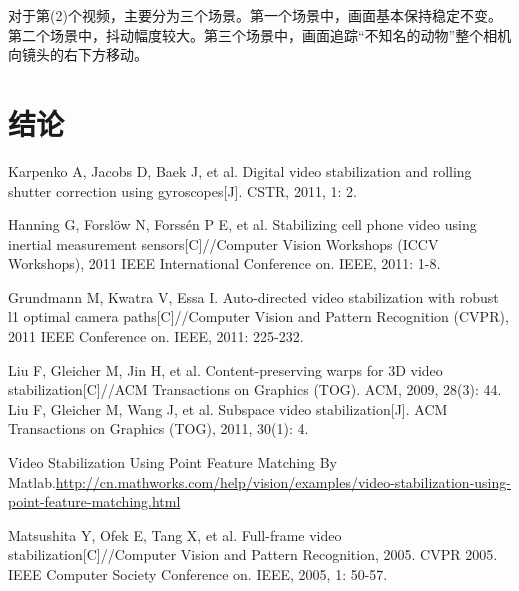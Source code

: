 \documentclass[journal, a4paper]{IEEEtran}
\begin{document}
    对于第(2)个视频，主要分为三个场景。第一个场景中，画面基本保持稳定不变。第二个场景中，抖动幅度较大。第三个场景中，画面追踪“不知名的动物”整个相机向镜头的右下方移动。
    
\section{结论}


\begin{thebibliography}{5}

Karpenko A, Jacobs D, Baek J, et al. Digital video stabilization and rolling shutter correction using gyroscopes[J]. CSTR, 2011, 1: 2.

    Hanning G, Forslöw N, Forssén P E, et al. Stabilizing cell phone video using inertial measurement sensors[C]//Computer Vision Workshops (ICCV Workshops), 2011 IEEE International Conference on. IEEE, 2011: 1-8.
    
    Grundmann M, Kwatra V, Essa I. Auto-directed video stabilization with robust l1 optimal camera paths[C]//Computer Vision and Pattern Recognition (CVPR), 2011 IEEE Conference on. IEEE, 2011: 225-232.
    
    Liu F, Gleicher M, Jin H, et al. Content-preserving warps for 3D video stabilization[C]//ACM Transactions on Graphics (TOG). ACM, 2009, 28(3): 44.
    Liu F, Gleicher M, Wang J, et al. Subspace video stabilization[J]. ACM Transactions on Graphics (TOG), 2011, 30(1): 4.
    
    Video Stabilization Using Point Feature Matching By Matlab.\url{http://cn.mathworks.com/help/vision/examples/video-stabilization-using-point-feature-matching.html}
    
    Matsushita Y, Ofek E, Tang X, et al. Full-frame video stabilization[C]//Computer Vision and Pattern Recognition, 2005. CVPR 2005. IEEE Computer Society Conference on. IEEE, 2005, 1: 50-57.
    

\end{thebibliography}

\end{document}
